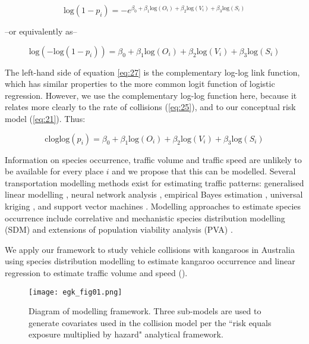 \begin{equation} \label{eq:26}
\text{log}(1-p_i)=-e^{\beta_0+\beta_1\text{log}(O_i)+\beta_2\text{log}(V_i)+\beta_3\text{log}(S_i)}
\end{equation}

\begin{center}
--or equivalently as-- 
\end{center}
\begin{equation} \label{eq:27}
\text{log}(-\text{log}(1-p_i))=\beta_0+\beta_1\text{log}(O_i)+\beta_2\text{log}(V_i)+\beta_3\text{log}(S_i)
\end{equation}

The left-hand side of equation \ref{eq:27} is the complementary log-log link function, which has similar properties to the more common logit function of logistic regression. However, we use the complementary log-log function here, because it relates more clearly to the rate of collisions (\ref{eq:25}), and to our conceptual risk model (\ref{eq:21}). Thus: 

\begin{equation} \label{eq:28}
\text{cloglog}(p_i)=\beta_0+\beta_1\text{log}(O_i)+\beta_2\text{log}(V_i)+\beta_3\text{log}(S_i)
\end{equation}

Information on species occurrence, traffic volume and traffic speed are unlikely to be available for every place $i$ and we propose that this can be modelled. Several transportation modelling methods exist for estimating traffic patterns: generalised linear modelling \citep{seav00,zhao01}, neural network analysis \citep{dudd13}, empirical Bayes estimation \citep{yang02}, universal kriging \citep{eom06,selb13}, and support vector machines \citep{cast09}. Modelling approaches to estimate species occurrence include correlative \citep{guis05,elit09} and mechanistic \citep{kear09} species distribution modelling (SDM) and extensions of population viability analysis (PVA) \citep{gilp86,shaf90}.

We apply our framework to study vehicle collisions with kangaroos in Australia using species distribution modelling to estimate kangaroo occurrence and linear regression to estimate traffic volume and speed ().

\begin{figure*}[htp]
  \centering
  \texttt{[image: egk\_fig01.png]}
  \caption[Diagram of modelling framework]{Diagram of modelling framework. Three sub-models are used to generate covariates used in the collision model per the ``risk equals exposure multiplied by hazard" analytical framework.}
  \label{egk_framework}
\end{figure*}
 
